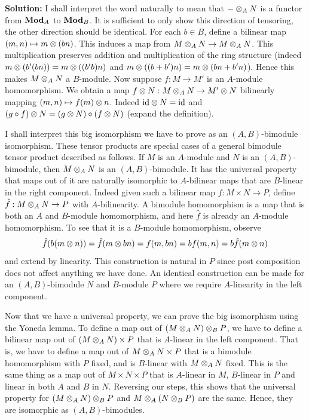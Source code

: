 \documentclass{article}
\begin{document}
\noindent\textbf{Solution:}
I shall interpret the word naturally to mean that \(- \otimes_A N\) is a functor from \(\mathbf{Mod}_A\) to \(\mathbf{Mod}_B\).
It is sufficient to only show this direction of tensoring, the other direction should be identical.
For each \(b \in B\), define a bilinear map \((m, n) \mapsto m \otimes (bn)\).
This induces a map from \(M \otimes_A N \to M \otimes_A N\).
This multiplication preserves addition and multiplication of the ring structure (indeed \(m \otimes (b'(b n)) = m \otimes ((b' b)n)\) and \(m \otimes ((b + b')n) = m \otimes (bn + b'n)\)).
Hence this makes \(M \otimes_A N\) a \(B\)-module.
Now suppose \(f : M \to M'\) is an \(A\)-module homomorphism.
We obtain a map \(f \otimes N : M \otimes_A N \to M' \otimes N\) bilinearly mapping \((m, n) \mapsto f(m) \otimes n\).
Indeed \(\mathrm{id} \otimes N = \mathrm{id}\) and \((g \circ f) \otimes N = (g \otimes N) \circ (f \otimes N)\) (expand the definition).

I shall interpret this big isomorphism we have to prove as an \((A, B)\)-bimodule isomorphism.
These tensor products are special cases of a general bimodule tensor product described as follows.
If \(M\) is an \(A\)-module and \(N\) is an \((A, B)\)-bimodule, then \(M \otimes_A N\) is an \((A, B)\)-bimodule.
It has the universal property that maps out of it are naturally isomorphic to \(A\)-bilinear maps that are \(B\)-linear in the right component.
Indeed given such a bilinear map \(f : M \times N \to P\), define \(\hat{f} : M \otimes_A N \to P\) with \(A\)-bilinearity.
A bimodule homomorphism is a map that is both an \(A\) and \(B\)-module homomorphism, and here \(\hat{f}\) is already an \(A\)-module homomorphism.
To see that it is a \(B\)-module homomorphism, observe
\[
    \hat{f}(b (m \otimes n)) = \hat{f}(m \otimes bn) = f(m, bn) = b f(m, n) = b \hat{f}(m \otimes n)
\]
and extend by linearity.
This construction is natural in \(P\) since post composition does not affect anything we have done.
An identical construction can be made for an \((A, B)\)-bimodule \(N\) and \(B\)-module \(P\) where we require \(A\)-linearity in the left component.

Now that we have a universal property, we can prove the big isomorphism using the Yoneda lemma.
To define a map out of \((M \otimes_A N) \otimes_B P\), we have to define a bilinear map out of \((M \otimes_A N) \times P\) that is \(A\)-linear in the left component.
That is, we have to define a map out of \(M \otimes_A N \times P\) that is a bimodule homomorphism with \(P\) fixed, and is \(B\)-linear with \(M \otimes_A N\) fixed.
This is the same thing as a map out of \(M \times N \times P\) that is \(A\)-linear in \(M\), \(B\)-linear in \(P\) and linear in both \(A\) and \(B\) in \(N\).
Reversing our steps, this shows that the universal property for \((M \otimes_A N) \otimes_B P\) and \(M \otimes_A (N \otimes_B P)\) are the same.
Hence, they are isomorphic as \((A, B)\)-bimodules.
\end{document}
